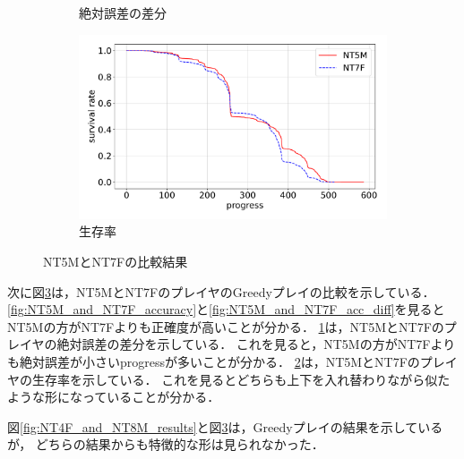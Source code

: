 \begin{figure}[t]
\begin{subfigure}[b]{0.49\linewidth}
    \caption{絶対誤差の差分}
    \label{fig:NT5M_and_NT7F_error_abs_diff}
\end{subfigure}
\begin{subfigure}[b]{0.49\linewidth}
    \includegraphics[width=\linewidth]{pdf/compare/NT5M_and_NT7F/survival.pdf}
    \caption{生存率}
    \label{fig:NT5M_and_NT7F_survival}
\end{subfigure}
\caption{NT5MとNT7Fの比較結果}
\label{fig:NT5M_and_NT7F_results}
\end{figure}

次に図\ref{fig:NT5M_and_NT7F_results}は，NT5MとNT7FのプレイヤのGreedyプレイの比較を示している．
\ref{fig:NT5M_and_NT7F_accuracy}と\ref{fig:NT5M_and_NT7F_acc_diff}を見ると
NT5Mの方がNT7Fよりも正確度が高いことが分かる．
\ref{fig:NT5M_and_NT7F_error_abs_diff}は，NT5MとNT7Fのプレイヤの絶対誤差の差分を示している．
これを見ると，NT5Mの方がNT7Fよりも絶対誤差が小さいprogressが多いことが分かる．
\ref{fig:NT5M_and_NT7F_survival}は，NT5MとNT7Fのプレイヤの生存率を示している．
これを見るとどちらも上下を入れ替わりながら似たような形になっていることが分かる．

図\ref{fig:NT4F_and_NT8M_results}と図\ref{fig:NT5M_and_NT7F_results}は，Greedyプレイの結果を示しているが，
どちらの結果からも特徴的な形は見られなかった．
    
